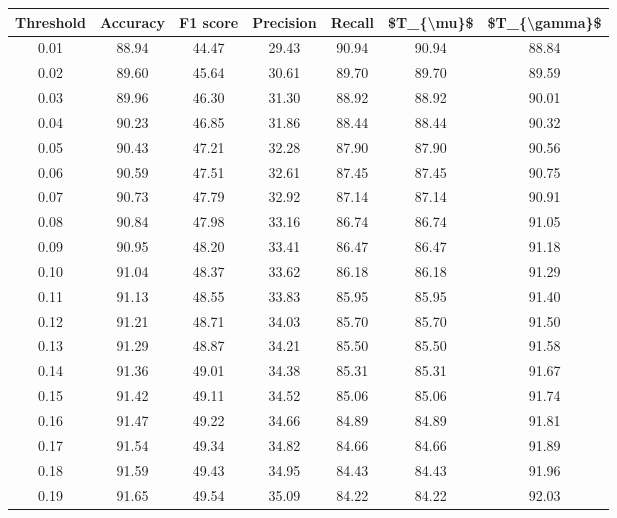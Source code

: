 \begin{tabular}{|c|c|c|c|c|c|c|}
\hline
 Threshold &  Accuracy &  F1 score &  Precision &  Recall &  \$T\_\{\textbackslash mu\}\$ &  \$T\_\{\textbackslash gamma\}\$ \\
\hline
      0.01 &     88.94 &     44.47 &      29.43 &   90.94 &      90.94 &         88.84 \\
      0.02 &     89.60 &     45.64 &      30.61 &   89.70 &      89.70 &         89.59 \\
      0.03 &     89.96 &     46.30 &      31.30 &   88.92 &      88.92 &         90.01 \\
      0.04 &     90.23 &     46.85 &      31.86 &   88.44 &      88.44 &         90.32 \\
      0.05 &     90.43 &     47.21 &      32.28 &   87.90 &      87.90 &         90.56 \\
      0.06 &     90.59 &     47.51 &      32.61 &   87.45 &      87.45 &         90.75 \\
      0.07 &     90.73 &     47.79 &      32.92 &   87.14 &      87.14 &         90.91 \\
      0.08 &     90.84 &     47.98 &      33.16 &   86.74 &      86.74 &         91.05 \\
      0.09 &     90.95 &     48.20 &      33.41 &   86.47 &      86.47 &         91.18 \\
      0.10 &     91.04 &     48.37 &      33.62 &   86.18 &      86.18 &         91.29 \\
      0.11 &     91.13 &     48.55 &      33.83 &   85.95 &      85.95 &         91.40 \\
      0.12 &     91.21 &     48.71 &      34.03 &   85.70 &      85.70 &         91.50 \\
      0.13 &     91.29 &     48.87 &      34.21 &   85.50 &      85.50 &         91.58 \\
      0.14 &     91.36 &     49.01 &      34.38 &   85.31 &      85.31 &         91.67 \\
      0.15 &     91.42 &     49.11 &      34.52 &   85.06 &      85.06 &         91.74 \\
      0.16 &     91.47 &     49.22 &      34.66 &   84.89 &      84.89 &         91.81 \\
      0.17 &     91.54 &     49.34 &      34.82 &   84.66 &      84.66 &         91.89 \\
      0.18 &     91.59 &     49.43 &      34.95 &   84.43 &      84.43 &         91.96 \\
      0.19 &     91.65 &     49.54 &      35.09 &   84.22 &      84.22 &         92.03 \\

\end{tabular}
